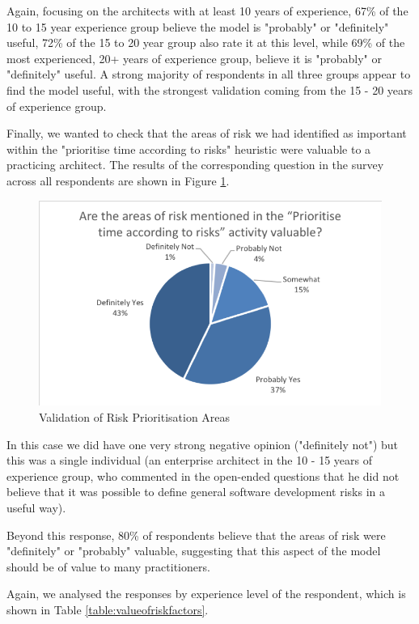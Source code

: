 Again, focusing on the architects with at least 10 years of experience, 67\% of the 10 to 15 year experience group believe the model is "probably" or "definitely" useful, 72\% of the 15 to 20 year group also rate it at this level, while 69\% of the most experienced, 20+ years of experience group, believe it is "probably" or "definitely" useful.  A strong majority of respondents in all three groups appear to find the model useful, with the strongest validation coming from the 15 - 20 years of experience group.

Finally, we wanted to check that the areas of risk we had identified as important within the "prioritise time according to risks" heuristic were valuable to a practicing architect.  The results of the corresponding question in the survey across all respondents are shown in Figure \ref{figure:validationofareas}.

\begin{figure}
\centering
\includegraphics[width=12cm]{Figures/prioritisation-riskareas}
\caption{Validation of Risk Prioritisation Areas}
\label{figure:validationofareas}
\end{figure}

In this case we did have one very strong negative opinion ("definitely not") but this was a single individual (an enterprise architect in the 10 - 15 years of experience group, who commented in the open-ended questions that he did not believe that it was possible to define general software development risks in a useful way).

Beyond this response, 80\% of respondents believe that the areas of risk were "definitely" or "probably" valuable, suggesting that this aspect of the model should be of value to many practitioners.

Again, we analysed the responses by experience level of the respondent, which is shown in Table \ref{table:valueofriskfactors}.

